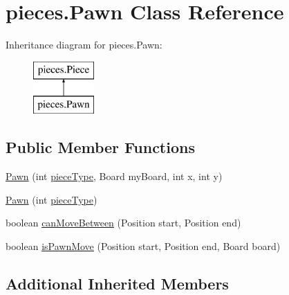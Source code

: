 \hypertarget{classpieces_1_1_pawn}{\section{pieces.\-Pawn Class Reference}
\label{classpieces_1_1_pawn}
}
Inheritance diagram for pieces.\-Pawn\-:\begin{figure}[H]
\begin{center}
\leavevmode
\includegraphics[height=2.000000cm]{classpieces_1_1_pawn}
\end{center}
\end{figure}
\subsection*{Public Member Functions}
\begin{DoxyCompactItemize}
\item 
\hyperlink{classpieces_1_1_pawn_afba214edbf76842349a8081436d65905}{Pawn} (int \hyperlink{classpieces_1_1_piece_ae40d6201d0aed36f369dd9d8f55892e3}{piece\-Type}, Board my\-Board, int x, int y)
\item 
\hyperlink{classpieces_1_1_pawn_adb247ab1ea60ba83ced124ce94776180}{Pawn} (int \hyperlink{classpieces_1_1_piece_ae40d6201d0aed36f369dd9d8f55892e3}{piece\-Type})
\item 
boolean \hyperlink{classpieces_1_1_pawn_a1786e32a231e36a9f68e5c55b5e957a0}{can\-Move\-Between} (Position start, Position end)
\item 
boolean \hyperlink{classpieces_1_1_pawn_ae977b1dff93961350fe4130639bc83f3}{is\-Pawn\-Move} (Position start, Position end, Board board)
\end{DoxyCompactItemize}
\subsection*{Additional Inherited Members}


